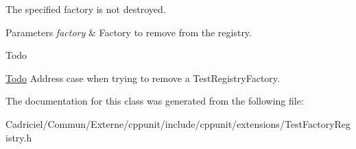 The specified factory is not destroyed. 
\begin{DoxyParams}{Parameters}
{\em factory} & Factory to remove from the registry. \\
\hline
\end{DoxyParams}
\begin{DoxyRefDesc}{Todo}
\item[\hyperlink{todo__todo000001}{Todo}]Address case when trying to remove a Test\-Registry\-Factory. \end{DoxyRefDesc}


The documentation for this class was generated from the following file\-:\begin{DoxyCompactItemize}
\item 
Cadriciel/\-Commun/\-Externe/cppunit/include/cppunit/extensions/Test\-Factory\-Registry.\-h\end{DoxyCompactItemize}
